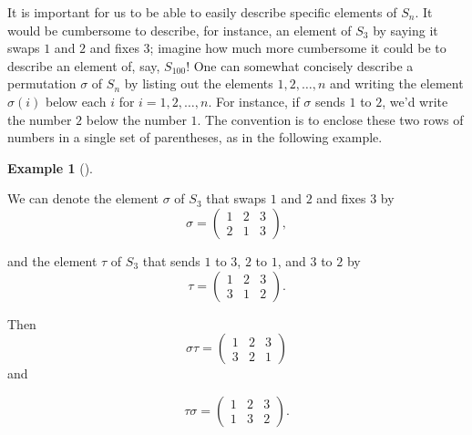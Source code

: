 \documentclass[10pt,]{book}
\theoremstyle{plain}
\theoremstyle{definition}
\theoremstyle{definition}
\theoremstyle{definition}
\newtheorem{example}[theorem]{Example}
\theoremstyle{definition}
\numberwithin{equation}{section}
\newcommand{\amp}{ & }
\begin{document}
    It is important for us to be able to easily describe specific elements of \(S_n\). It would be cumbersome to describe, for instance, an element of \(S_3\) by saying it swaps \(1\) and \(2\) and fixes \(3\); imagine how much more cumbersome it could be to describe an element of, say, \(S_{100}\)! One can somewhat concisely describe a permutation \(\sigma\) of \(S_n\) by listing out the elements \(1,2,\ldots,n\) and writing the element \(\sigma(i)\) below each \(i\) for \(i=1,2,\ldots, n\).
    For instance, if \(\sigma\) sends \(1\) to \(2\), we'd write the number \(2\) below the number \(1\). The convention is to enclose these two rows of numbers in a single set of parentheses, as in the following example.
\begin{example}[]\label{nocommute}

        We can denote the element \(\sigma\) of \(S_3\) that swaps \(1\) and \(2\) and fixes \(3\) by
\begin{equation*}

          \sigma = \begin{pmatrix}1\amp 2\amp 3\\ 2\amp 1\amp 3
          \end{pmatrix},
        
\end{equation*}

        and the element \(\tau\) of \(S_3\) that sends \(1\) to \(3\), \(2\) to \(1\), and \(3\) to \(2\) by
\begin{equation*}

          \tau =\begin{pmatrix}1\amp 2\amp 3\\ 3\amp 1\amp 2
          \end{pmatrix}.
        
\end{equation*}

\par

        Then
\begin{equation*}

          \sigma\tau = \begin{pmatrix}1\amp 2\amp 3\\ 3\amp 2\amp 1
          \end{pmatrix}
\end{equation*}
 and
        
%
\begin{equation*}
          \tau\sigma = \begin{pmatrix}1\amp 2\amp 3\\ 1\amp 3\amp 2
          \end{pmatrix}.
        
\end{equation*}

\end{example}
\par
\end{document}
